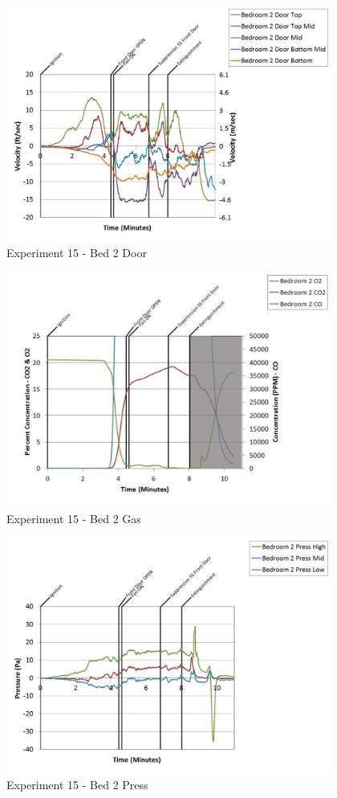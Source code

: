 \documentclass{article}
\begin{document}
\begin{appendices}
	\clearpage

	\begin{figure}[h!]
		\centering
		\includegraphics[height=3.05in]{0_Images/Results_Charts/Exp_15_Charts/Bed2Door.pdf}
		\caption{Experiment 15 - Bed 2 Door}
	\end{figure}
 

	\begin{figure}[h!]
		\centering
		\includegraphics[height=3.05in]{0_Images/Results_Charts/Exp_15_Charts/Bed2Gas.pdf}
		\caption{Experiment 15 - Bed 2 Gas}
	\end{figure}
 
	\clearpage

	\begin{figure}[h!]
		\centering
		\includegraphics[height=3.05in]{0_Images/Results_Charts/Exp_15_Charts/Bed2Press.pdf}
		\caption{Experiment 15 - Bed 2 Press}
	\end{figure}
 


\end{appendices}
\end{document}
